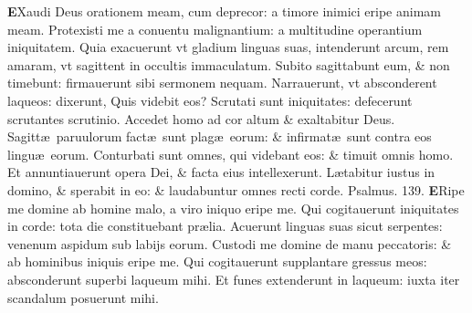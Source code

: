 \documentclass[a5paper,10pt]{book}
\def\ae{æ}
\begin{document}
\begin{multicols*}{2}
\vspace{-1.5em}
\lettrine[lines=2]{\bfseries \color{red} E}{}Xaudi Deus orationem meam, cum deprecor: a timore inimici eripe animam meam.
\newline \color{red} P\color{black}rotexisti me a conuentu malignantium: a multitudine operantium iniquitatem.
\newline \color{red} Q\color{black}uia exacuerunt vt gladium linguas suas, intenderunt arcum, rem amaram, vt sagittent in occultis immaculatum.
\newline \color{red} S\color{black}ubito sagittabunt eum, \& non timebunt: firmauerunt sibi sermonem nequam.
\newline \color{red} N\color{black}arrauerunt, vt absconderent laqueos: dixerunt, Quis videbit eos?
\newline \color{red} S\color{black}crutati sunt iniquitates: defecerunt scrutantes scrutinio.
\newline \color{red} A\color{black}ccedet homo ad cor altum \& exaltabitur Deus.
\newline \color{red} S\color{black}agitt\ae \ paruulorum fact\ae \ sunt plag\ae \ eorum: \& infirmat\ae \ sunt contra eos lingu\ae \ eorum.
\newline \color{red} C\color{black}onturbati sunt omnes, qui videbant eos: \& timuit omnis homo.
\newline \color{red} E\color{black}t annuntiauerunt opera Dei, \& facta eius intellexerunt.
\newline \color{red} L\color{black}\ae tabitur iustus in domino, \& sperabit in eo: \& laudabuntur omnes recti corde. \quad \color{red} Psalmus. \hypertarget{ps139}{139.} \color{black}
\lettrine[lines=2]{\bfseries \color{red} E}{}Ripe me domine ab homine malo, a viro iniquo eripe me.
\newline \color{red} Q\color{black}ui cogitauerunt iniquitates in corde: tota die constituebant pr\ae lia.
\newline \color{red} A\color{black}cuerunt linguas suas sicut serpentes: venenum aspidum sub labijs eorum.%
\newline \color{red} C\color{black}ustodi me domine de manu peccatoris: \& ab hominibus iniquis eripe me.
\newline \color{red} Q\color{black}ui cogitauerunt supplantare gressus meos: absconderunt superbi laqueum mihi.
\newline \color{red} E\color{black}t funes extenderunt in laqueum: iuxta iter scandalum posuerunt mihi.

\end{multicols*}
\end{document}
